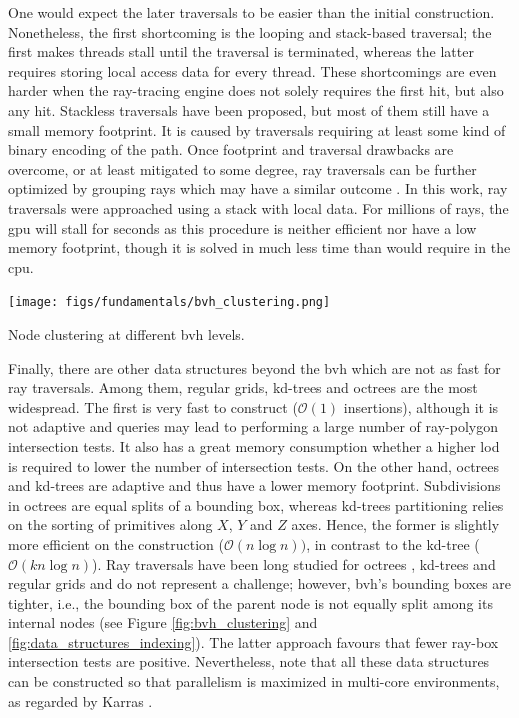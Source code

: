 One would expect the later traversals to be easier than the initial construction. Nonetheless, the first shortcoming is the looping and stack-based traversal; the first makes threads stall until the traversal is terminated, whereas the latter requires storing local access data for every thread. These shortcomings are even harder when the ray-tracing engine does not solely requires the first hit, but also any hit. Stackless traversals have been proposed, but most of them still have a small memory footprint\cite{meister_survey_2021}. It is caused by traversals requiring at least some kind of binary encoding of the path. Once footprint and traversal drawbacks are overcome, or at least mitigated to some degree, ray traversals can be further optimized by grouping rays which may have a similar outcome \cite{hendrich_ray_2019}. In this work, ray traversals were approached using a stack with local data. For millions of rays, the \acrshort{gpu} will stall for seconds as this procedure is neither efficient nor have a low memory footprint, though it is solved in much less time than would require in the \acrshort{cpu}. 

\begin{marginfigure}[-1.0cm]
    \texttt{[image: figs/fundamentals/bvh\_clustering.png]}
	\caption{Node clustering at different \acrshort{bvh} levels. }
    \label{fig:bvh_clustering}
\end{marginfigure}
Finally, there are other data structures beyond the \acrshort{bvh} which are not as fast for ray traversals. Among them, regular grids, kd-trees and octrees are the most widespread. The first is very fast to construct ($\mathcal{O}(1)$ insertions), although it is not adaptive and queries may lead to performing a large number of ray-polygon intersection tests. It also has a great memory consumption whether a higher \acrshort{lod} is required to lower the number of intersection tests. On the other hand, octrees and kd-trees are adaptive and thus have a lower memory footprint. Subdivisions in octrees are equal splits of a bounding box, whereas kd-trees partitioning relies on the sorting of primitives along $X$, $Y$ and $Z$ axes. Hence, the former is slightly more efficient on the construction ($\mathcal{O}(n \log{n}))$, in contrast to the kd-tree ($\mathcal{O}(kn \log{n})$). Ray traversals have been long studied for octrees \cite{revelles_efficient_2000}, kd-trees \cite{dos_santos_kd-tree_2009} and regular grids \cite{amanatides_fast_1987} and do not represent a challenge; however, \acrshort{bvh}'s bounding boxes are tighter, i.e., the bounding box of the parent node is not equally split among its internal nodes (see Figure \ref{fig:bvh_clustering} and \ref{fig:data_structures_indexing}). The latter approach favours that fewer ray-box intersection tests are positive. Nevertheless, note that all these data structures can be constructed so that parallelism is maximized in multi-core environments, as regarded by Karras \cite{karras_maximizing_2012}.

